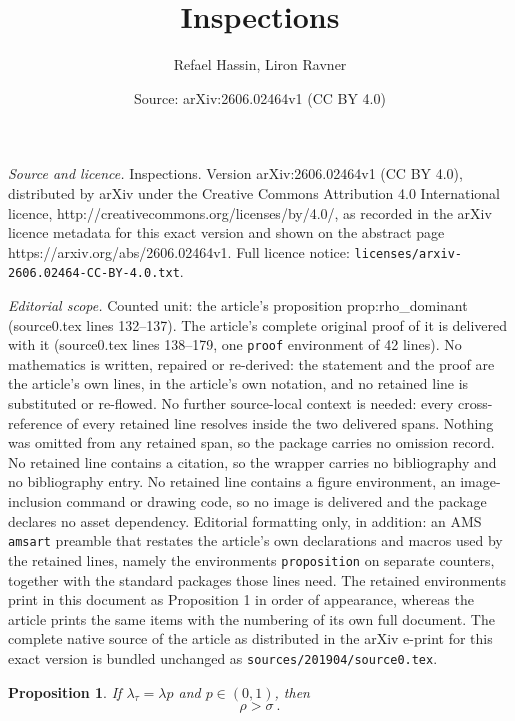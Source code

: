 \documentclass[10pt,a4paper]{amsart}
\title{Inspections}
\author{Refael Hassin, Liron Ravner}
\date{Source: arXiv:2606.02464v1 (CC BY 4.0)}
\newtheorem{proposition}{Proposition}
\begin{document}
\maketitle

\noindent\emph{Source and licence.} Inspections. Version arXiv:2606.02464v1 (CC BY 4.0), distributed by arXiv under the Creative Commons Attribution 4.0 International licence, http://creativecommons.org/licenses/by/4.0/, as recorded in the arXiv licence metadata for this exact version and shown on the abstract page https://arxiv.org/abs/2606.02464v1. Full licence notice: \texttt{licenses/arxiv-2606.02464-CC-BY-4.0.txt}.\par\smallskip

\noindent\textit{Editorial scope.} Counted unit: the article's proposition prop:rho\_dominant (source0.tex lines 132--137). The article's complete original proof of it is delivered with it (source0.tex lines 138--179, one \texttt{proof} environment of 42 lines). No mathematics is written, repaired or re-derived: the statement and the proof are the article's own lines, in the article's own notation, and no retained line is substituted or re-flowed.  No further source-local context is needed: every cross-reference of every retained line resolves inside the two delivered spans.  Nothing was omitted from any retained span, so the package carries no omission record.  No retained line contains a citation, so the wrapper carries no bibliography and no bibliography entry.  No retained line contains a figure environment, an image-inclusion command or drawing code, so no image is delivered and the package declares no asset dependency.  Editorial formatting only, in addition: an AMS \texttt{amsart} preamble that restates the article's own declarations and macros used by the retained lines, namely the environments \texttt{proposition} on separate counters, together with the standard packages those lines need.  The retained environments print in this document as Proposition 1 in order of appearance, whereas the article prints the same items with the numbering of its own full document.  The complete native source of the article as distributed in the arXiv e-print for this exact version is bundled unchanged as \texttt{sources/201904/source0.tex}.
\begin{proposition}\label{prop:rho_dominant}
 If $\lambda_\tau=\lambda p$ and $p\in(0,1)$, then
 \begin{equation}\label{eq:rho_dominant}
      \rho>\sigma\ .
\end{equation}
\end{proposition}
\end{document}
